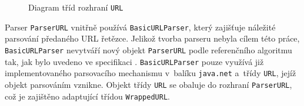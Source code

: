 \begin{figure}[H]
  \begin{center}
    \caption{Diagram tříd rozhraní \texttt{URL}}
    \label{Figure.URLInterface}
  \end{center}
\end{figure}

Parser \texttt{ParserURL} vnitřně používá \texttt{BasicURLParser}, který zajišťuje náležité parsování předaného URL řetězce. Jelikož tvorba parseru nebyla cílem této práce, \texttt{BasicURLParser} nevytváří nový objekt \texttt{ParserURL} podle referenčního algoritmu tak, jak bylo uvedeno ve specifikaci \cite{Bibliography.URLStandard}. \texttt{BasicURLParser} pouze využívá již implementovaného parsovacího mechanismu v~balíku \texttt{java.net} a~třídy \texttt{URL}, jejíž objekt parsováním vznikne. Objekt třídy \texttt{URL} se obaluje do rozhraní \texttt{ParserURL}, což je zajištěno adaptující třídou \texttt{WrappedURL}.

